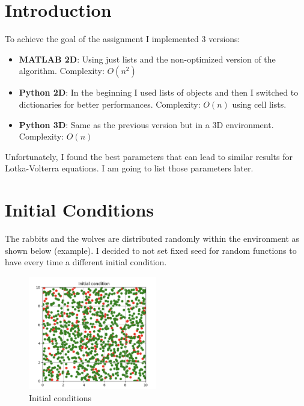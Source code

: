 \documentclass[unicode,11pt,a4paper,oneside,numbers=endperiod,openany]{scrartcl}
\begin{document}
\setassignment

\newline
\section*{Introduction}
To achieve the goal of the assignment I implemented 3 versions:
\begin{itemize}
  \item \textbf{MATLAB 2D}: Using just lists and the non-optimized version of the algorithm. Complexity: $O(n^2)$
  \item \textbf{Python 2D}: In the beginning I used lists of objects and then I switched to dictionaries for better performances. Complexity: $O(n)$ using cell lists. 
  \item \textbf{Python 3D}: Same as the previous version but in a 3D environment. Complexity: $O(n)$
\end{itemize}
Unfortunately, I found the best parameters that can lead to similar  results for Lotka-Volterra equations. I am going to list those parameters later. 
\section*{Initial Conditions}
The rabbits and the wolves are distributed randomly within the environment as shown below (example). I decided to not set fixed seed for random functions
to have every time a different initial condition.
\begin{figure}[H]
  \centering
  \includegraphics[width=0.5\textwidth]{output_main/Initial_condition.png}
  \caption{Initial conditions}
\end{figure}
\end{document}
